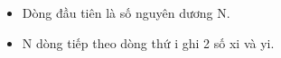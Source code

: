 \begin{itemize}
	\item     Dòng đầu tiên là số nguyên dương N.   
	\item     N dòng tiếp theo dòng thứ i ghi 2 số xi và yi.   
\end{itemize}